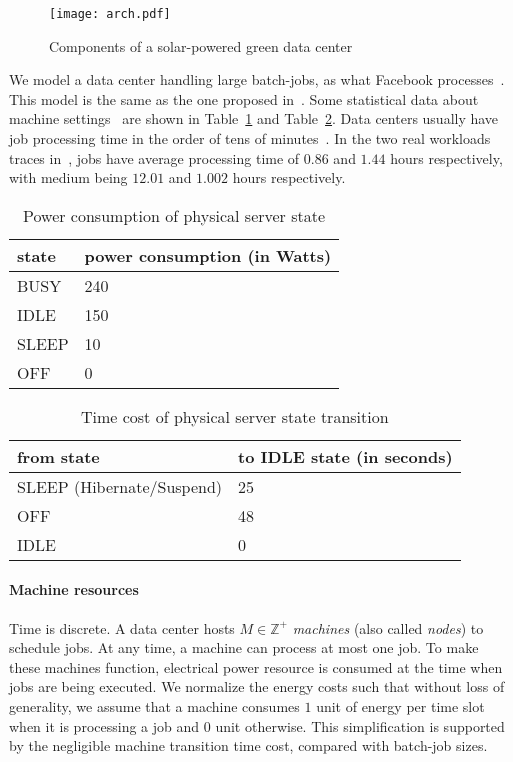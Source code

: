 \documentclass[conference]{IEEEtran}
\begin{document}
\begin{figure}[h!]
\center
\texttt{[image: arch.pdf]}
\caption{Components of a solar-powered green data center}
\label{fig:system}
\end{figure}

We model a data center handling large batch-jobs, as what Facebook processes~\cite{SWIM, AdnanSGK12}. This model is the same as the one proposed in~\cite{PinheiroBCH01}. Some statistical data about machine settings~\cite{MohanS12} are shown in Table~\ref{tb:power_consumption} and Table~\ref{tb:setup-time}. Data centers usually have job processing time in the order of tens of minutes~\cite{KavulyaTGN10}. In the two real workloads traces in~\cite{Grid5k, Intrepid}, jobs have average processing time of $0.86$ and $1.44$ hours respectively, with medium being $12.01$ and $1.002$ hours respectively.

\begin{table}[h!]
\centering
\caption{Power consumption of physical server state}
\begin{tabular}{|l|l|}
\hline
state & power consumption (in Watts)\\ \hline \hline
BUSY & 240\\ \hline
IDLE & 150\\ \hline
SLEEP & 10\\ \hline
OFF & 0\\ \hline
\end{tabular}
\label{tb:power_consumption}
\end{table}

\begin{table}[ht!]
\centering
\caption{Time cost of physical server state transition}
\begin{tabular}{|l|l|}
\hline
from state & to IDLE state (in seconds)\\ \hline
SLEEP (Hibernate/Suspend) & 25\\ \hline
OFF & 48\\ \hline
IDLE & 0\\ \hline
\end{tabular}
\label{tb:setup-time}
\end{table}

\paragraph*{Machine resources}

Time is discrete. A data center hosts $M \in \mathbb{Z^+}$ \emph{machines} (also called \emph{nodes}) to schedule jobs. At any time, a machine can process at most one job. To make these machines function, electrical power resource is consumed at the time when jobs are being executed. We normalize the energy costs such that without loss of generality, we assume that a machine consumes $1$ unit of energy per time slot when it is processing a job and $0$ unit otherwise. This simplification is supported by the negligible machine transition time cost, compared with batch-job sizes.
\end{document}
